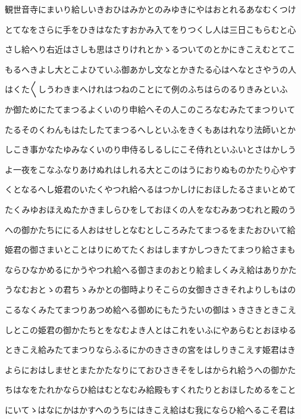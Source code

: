 \documentclass[a4paper,11pt,landscape]{ltjtarticle}
\begin{document}
観世音寺にまいり給しいきおひはみかとのみゆきにやはおとれるあなむくつけ
\par\medskip
とてなをさらに手をひきはなたすおかみ入てをりつくし人は三日こもらむと心
\par\medskip
さし給へり右近はさしも思はさりけれとかゝるついてのとかにきこえむとてこ
\par\medskip
もるへきよし大とこよひていふ御あかし文なとかきたる心はへなとさやうの人
\par\medskip
はくた〱しうわきまへけれはつねのことにて例のふちはらのるりきみといふ
\par\medskip
か御ためにたてまつるよくいのり申給へその人このころなむみたてまつりいて
\par\medskip
たるそのくわんもはたしたてまつるへしといふをきくもあはれなり法師いとか
\par\medskip
しこき事かなたゆみなくいのり申侍るしるしにこそ侍れといふいとさはかしう
\par\medskip
よ一夜をこなふなりあけぬれはしれる大とこのはうにおりぬものかたり心やす
\par\medskip
くとなるへし姫君のいたくやつれ給へるはつかしけにおほしたるさまいとめて
\par\medskip
たくみゆおほえぬたかきましらひをしておほくの人をなむみあつむれと殿のう
\par\medskip
への御かたちににる人おはせしとなむとしころみたてまつるをまたおひいて給
\par\medskip
姫君の御さまいとことはりにめてたくおはしますかしつきたてまつり給さまも
\par\medskip
ならひなかめるにかうやつれ給へる御さまのおとり給ましくみえ給はありかた
\par\medskip
うなむおとゝの君ちゝみかとの御時よりそこらの女御きさきそれよりしもはの
\par\medskip
こるなくみたてまつりあつめ給へる御めにもたうたいの御はゝきさきときこえ
\par\medskip
しとこの姫君の御かたちとをなむよき人とはこれをいふにやあらむとおほゆる
\par\medskip
ときこえ給みたてまつりならふるにかのきさきの宮をはしりきこえす姫君はき
\par\medskip
よらにおはしませとまたかたなりにておひさきそをしはかられ給うへの御かた
\par\medskip
ちはなをたれかならひ給はむとなむみ給殿もすくれたりとおほしためるをこと
\par\medskip
にいてゝはなにかはかすへのうちにはきこえ給はむ我にならひ給へるこそ君は
\par\medskip
\end{document}
